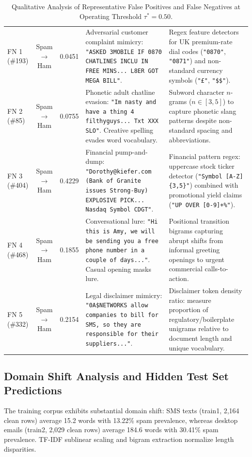 \documentclass[9.5pt,twocolumn,letterpaper]{article}
\begin{document}
\begin{table}[t]
\begin{tabularx}{\textwidth}{l c c X X}
FN 1 (\#193) & Spam $\to$ Ham & 0.0451 & Adversarial customer complaint mimicry: \texttt{"ASKED 3MOBILE IF 0870 CHATLINES INCLU IN FREE MINS... L8ER GOT MEGA BILL"}. & Regex feature detectors for UK premium-rate dial codes (\texttt{"0870"}, \texttt{"0871"}) and non-standard currency symbols (\texttt{"£"}, \texttt{"\$\$"}). \\
FN 2 (\#85) & Spam $\to$ Ham & 0.0755 & Phonetic adult chatline evasion: \texttt{"Im nasty and have a thing 4 filthyguys... Txt XXX SLO"}. Creative spelling evades word vocabulary. & Subword character $n$-grams ($n \in [3, 5]$) to capture phonetic slang patterns despite non-standard spacing and abbreviations. \\
FN 3 (\#404) & Spam $\to$ Ham & 0.4229 & Financial pump-and-dump: \texttt{"Dorothy@kiefer.com (Bank of Granite issues Strong-Buy) EXPLOSIVE PICK... Nasdaq Symbol CDGT"}. & Financial pattern regex: uppercase stock ticker detector (\texttt{"Symbol [A-Z]\{3,5\}"}) combined with promotional yield claims (\texttt{"UP OVER [0-9]+\%"}). \\
FN 4 (\#468) & Spam $\to$ Ham & 0.1855 & Conversational lure: \texttt{"Hi this is Amy, we will be sending you a free phone number in a couple of days..."}. Casual opening masks lure. & Positional transition bigrams capturing abrupt shifts from informal greeting openings to urgent commercial calls-to-action. \\
FN 5 (\#332) & Spam $\to$ Ham & 0.2154 & Legal disclaimer mimicry: \texttt{"0A\$NETWORKS allow companies to bill for SMS, so they are responsible for their suppliers..."}. & Disclaimer token density ratio: measure proportion of regulatory/boilerplate unigrams relative to document length and unique vocabulary. \\
\bottomrule
\end{tabularx}
\caption{Qualitative Analysis of Representative False Positives and False Negatives at Operating Threshold $\tau^*=0.50$.}
\label{tab:error_forensics}
\end{table}

\subsection{Domain Shift Analysis and Hidden Test Set Predictions}
The training corpus exhibits substantial domain shift: SMS texts (train1, 2,164 clean rows) average 15.2 words with 13.22\% spam prevalence, whereas desktop emails (train2, 2,029 clean rows) average 184.6 words with 30.41\% spam prevalence. TF-IDF sublinear scaling and bigram extraction normalize length disparities.
\end{document}
